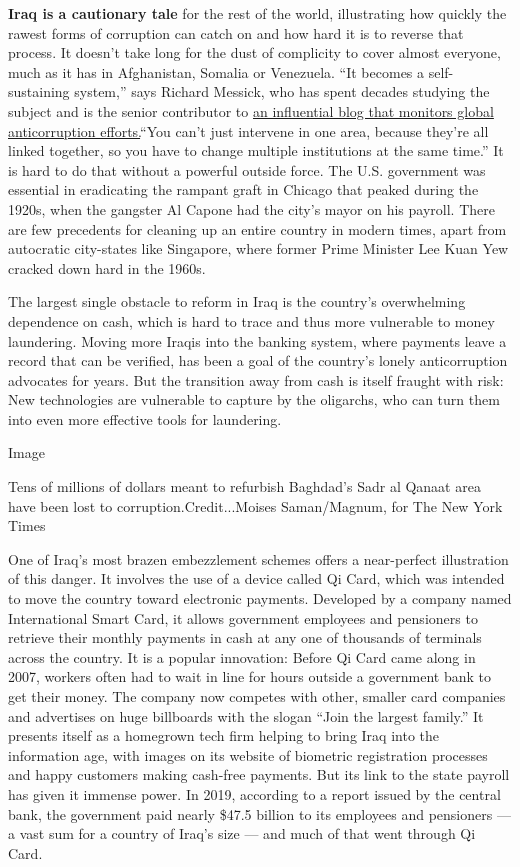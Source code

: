 \textbf{Iraq is a cautionary tale} for the rest of the world,
illustrating how quickly the rawest forms of corruption can catch on and
how hard it is to reverse that process. It doesn't take long for the
dust of complicity to cover almost everyone, much as it has in
Afghanistan, Somalia or Venezuela. ``It becomes a self-sustaining
system,'' says Richard Messick, who has spent decades studying the
subject and is the senior contributor to
\href{https://globalanticorruptionblog.com/}{an influential blog that
monitors global anticorruption efforts.}``You can't just intervene in
one area, because they're all linked together, so you have to change
multiple institutions at the same time.'' It is hard to do that without
a powerful outside force. The U.S. government was essential in
eradicating the rampant graft in Chicago that peaked during the 1920s,
when the gangster Al Capone had the city's mayor on his payroll. There
are few precedents for cleaning up an entire country in modern times,
apart from autocratic city-states like Singapore, where former Prime
Minister Lee Kuan Yew cracked down hard in the 1960s.

The largest single obstacle to reform in Iraq is the country's
overwhelming dependence on cash, which is hard to trace and thus more
vulnerable to money laundering. Moving more Iraqis into the banking
system, where payments leave a record that can be verified, has been a
goal of the country's lonely anticorruption advocates for years. But the
transition away from cash is itself fraught with risk: New technologies
are vulnerable to capture by the oligarchs, who can turn them into even
more effective tools for laundering.

Image

Tens of millions of dollars meant to refurbish Baghdad's Sadr al Qanaat
area have been lost to corruption.Credit...Moises Saman/Magnum, for The
New York Times

One of Iraq's most brazen embezzlement schemes offers a near-perfect
illustration of this danger. It involves the use of a device called Qi
Card, which was intended to move the country toward electronic payments.
Developed by a company named International Smart Card, it allows
government employees and pensioners to retrieve their monthly payments
in cash at any one of thousands of terminals across the country. It is a
popular innovation: Before Qi Card came along in 2007, workers often had
to wait in line for hours outside a government bank to get their money.
The company now competes with other, smaller card companies and
advertises on huge billboards with the slogan ``Join the largest
family.'' It presents itself as a homegrown tech firm helping to bring
Iraq into the information age, with images on its website of biometric
registration processes and happy customers making cash-free payments.
But its link to the state payroll has given it immense power. In 2019,
according to a report issued by the central bank, the government paid
nearly \$47.5 billion to its employees and pensioners --- a vast sum for
a country of Iraq's size --- and much of that went through Qi Card.

